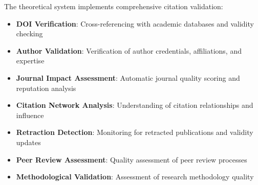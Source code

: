 \documentclass[12pt,a4paper,twoside]{article}
\begin{document}
The theoretical system implements comprehensive citation validation:

\begin{itemize}
\item \textbf{DOI Verification}: Cross-referencing with academic databases and validity checking
\item \textbf{Author Validation}: Verification of author credentials, affiliations, and expertise
\item \textbf{Journal Impact Assessment}: Automatic journal quality scoring and reputation analysis
\item \textbf{Citation Network Analysis}: Understanding of citation relationships and influence
\item \textbf{Retraction Detection}: Monitoring for retracted publications and validity updates
\item \textbf{Peer Review Assessment}: Quality assessment of peer review processes
\item \textbf{Methodological Validation}: Assessment of research methodology quality
\end{itemize}
\end{document}

